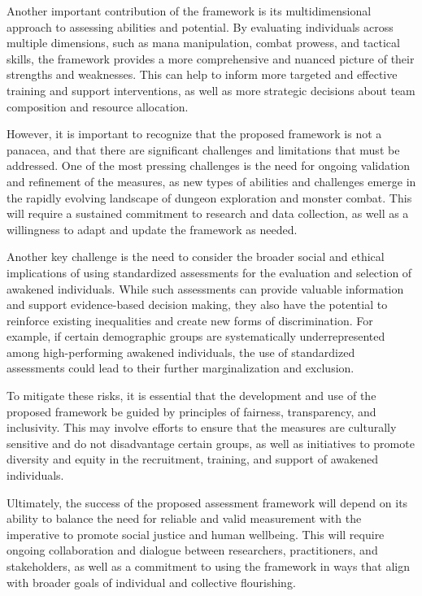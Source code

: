 \documentclass[12pt, a4paper]{article}
\begin{document}
Another important contribution of the framework is its multidimensional approach to assessing abilities and potential. By evaluating individuals across multiple dimensions, such as mana manipulation, combat prowess, and tactical skills, the framework provides a more comprehensive and nuanced picture of their strengths and weaknesses. This can help to inform more targeted and effective training and support interventions, as well as more strategic decisions about team composition and resource allocation.

However, it is important to recognize that the proposed framework is not a panacea, and that there are significant challenges and limitations that must be addressed. One of the most pressing challenges is the need for ongoing validation and refinement of the measures, as new types of abilities and challenges emerge in the rapidly evolving landscape of dungeon exploration and monster combat. This will require a sustained commitment to research and data collection, as well as a willingness to adapt and update the framework as needed.

Another key challenge is the need to consider the broader social and ethical implications of using standardized assessments for the evaluation and selection of awakened individuals. While such assessments can provide valuable information and support evidence-based decision making, they also have the potential to reinforce existing inequalities and create new forms of discrimination. For example, if certain demographic groups are systematically underrepresented among high-performing awakened individuals, the use of standardized assessments could lead to their further marginalization and exclusion.

To mitigate these risks, it is essential that the development and use of the proposed framework be guided by principles of fairness, transparency, and inclusivity. This may involve efforts to ensure that the measures are culturally sensitive and do not disadvantage certain groups, as well as initiatives to promote diversity and equity in the recruitment, training, and support of awakened individuals.

Ultimately, the success of the proposed assessment framework will depend on its ability to balance the need for reliable and valid measurement with the imperative to promote social justice and human wellbeing. This will require ongoing collaboration and dialogue between researchers, practitioners, and stakeholders, as well as a commitment to using the framework in ways that align with broader goals of individual and collective flourishing.
\end{document}
